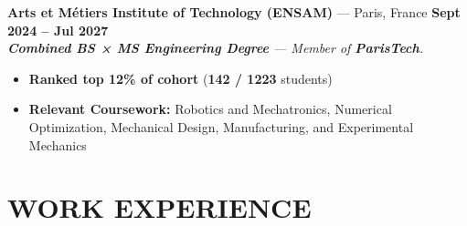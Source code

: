 \documentclass[10pt]{article}
\begin{document}
\textbf{Arts et Métiers Institute of Technology (ENSAM)} --- Paris, France \hfill \textbf{Sept 2024 -- Jul 2027}\\
\textit{\textbf{Combined BS × MS Engineering Degree} — Member of \textbf{ParisTech}.}


\begin{itemize}[leftmargin=*, topsep=0pt, parsep=0pt, itemsep=0.5pt]
    \item \textbf{Ranked top 12\% of cohort} (\textbf{142 / 1223} students)
\item \textbf{Relevant Coursework:} Robotics and Mechatronics, Numerical Optimization, Mechanical Design, Manufacturing, and Experimental Mechanics

\end{itemize}

\medskip

\section*{WORK EXPERIENCE}
\end{document}
